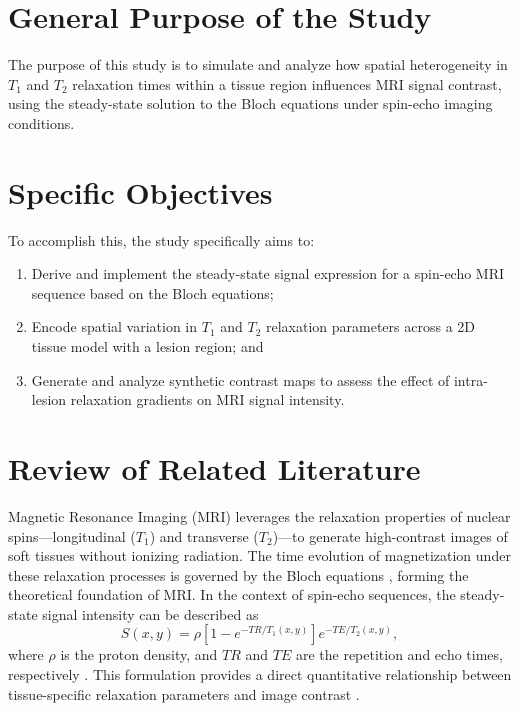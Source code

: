 \documentclass[10pt,a4paper,twoside]{article}
\begin{document}
\section{General Purpose of the Study}\label{sec:generalobjectives}
The purpose of this study is to simulate and analyze how spatial heterogeneity in \(T_1\) and \(T_2\) relaxation times within a tissue region influences MRI signal contrast, using the steady-state solution to the Bloch equations under spin-echo imaging conditions.

\section{Specific Objectives}\label{sec:specificobjectives}
To accomplish this, the study specifically aims to:
\begin{enumerate}
    \item Derive and implement the steady-state signal expression for a spin-echo MRI sequence based on the Bloch equations;
    \item Encode spatial variation in \(T_1\) and \(T_2\) relaxation parameters across a 2D tissue model with a lesion region; and
    \item Generate and analyze synthetic contrast maps to assess the effect of intra-lesion relaxation gradients on MRI signal intensity.
\end{enumerate}

\section{Review of Related Literature}\label{sec:rrl}

Magnetic Resonance Imaging (MRI) leverages the relaxation properties of nuclear spins---longitudinal (\( T_1 \)) and transverse (\( T_2 \))---to generate high-contrast images of soft tissues without ionizing radiation. The time evolution of magnetization under these relaxation processes is governed by the Bloch equations \cite{bloch1946}, forming the theoretical foundation of MRI. In the context of spin-echo sequences, the steady-state signal intensity can be described as
\begin{equation}
S(x, y) = \rho \left[ 1 - e^{-TR/T_1(x, y)}\right] e^{-TE/T_2(x, y)},
\label{eq:signal}
\end{equation}
where \( \rho \) is the proton density, and \( TR \) and \( TE \) are the repetition and echo times, respectively \cite{bernstein2004}. This formulation provides a direct quantitative relationship between tissue-specific relaxation parameters and image contrast \cite{brown2014}.
\end{document}
